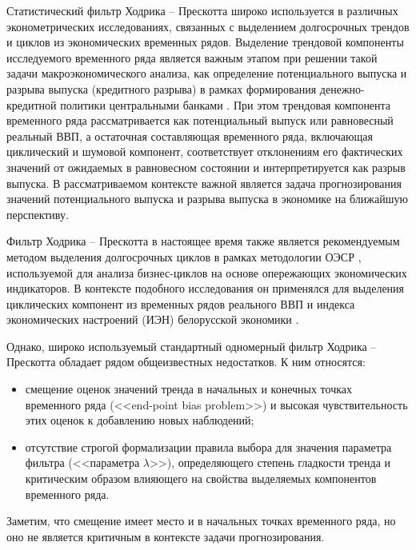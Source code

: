 \documentclass[a4paper,14pt]{extreport}
\begin{document}
	Статистический фильтр Ходрика -- Прескотта \cite{hp_orig_paper} широко используется в различных эконометрических исследованиях, связанных с выделением долгосрочных трендов и циклов из экономических временных рядов. Выделение трендовой компоненты исследуемого временного ряда является важным этапом при решении такой задачи макроэкономического анализа, как определение потенциального выпуска и разрыва выпуска (кредитного разрыва) в рамках формирования денежно-кредитной политики центральными банками \cite{zubarev_gap, demidenko_gap, schuler_detrend}. При этом трендовая компонента временного ряда рассматривается как потенциальный выпуск или равновесный реальный ВВП, а остаточная составляющая временного ряда, включающая циклический и шумовой компонент,  соответствует отклонениям его фактических значений  от ожидаемых в равновесном состоянии и интерпретируется как разрыв выпуска. В рассматриваемом контексте важной является задача прогнозирования значений потенциального выпуска и разрыва выпуска в экономике на ближайшую перспективу. 
	
	Фильтр Ходрика -- Прескотта в настоящее время также является рекомендуемым методом выделения долгосрочных циклов в рамках методологии ОЭСР \cite{oecdCLI, oecdCycleExtraction}, используемой для анализа бизнес-циклов на основе опережающих экономических индикаторов. В контексте подобного исследования он применялся для выделения циклических компонент из временных рядов реального ВВП и индекса экономических настроений (ИЭН) белорусской экономики \cite{esiMakingAlt}. 
	
	Однако, широко используемый стандартный одномерный фильтр Ходрика -- Прескотта обладает рядом общеизвестных недостатков.  К ним относятся: 
	
	\begin{itemize}
		\item смещение оценок значений тренда в начальных и конечных точках временного ряда (<<end-point bias problem>>) и высокая чувствительность этих оценок к добавлению новых наблюдений; 
		\item отсутствие строгой формализации правила выбора для значения параметра фильтра (<<параметра $\lambda$>>), определяющего степень гладкости тренда и критическим образом влияющего на свойства выделяемых компонентов временного ряда.
	\end{itemize}
	
	Заметим, что смещение имеет место и в начальных точках временного ряда, но оно не является критичным в контексте задачи прогнозирования.
	
\end{document}
